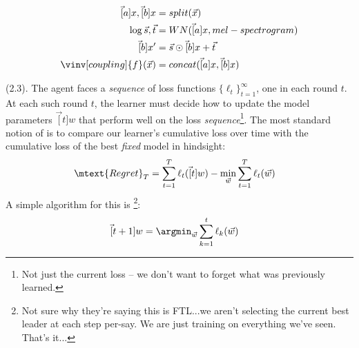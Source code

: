 \documentclass[11pt]{article}
\begin{document}


\begin{align}
\vec[a]{x}, \vec[b]{x}
&= split(\vec x) \\
\log \vec s , \vec t
&= WN(\vec[a]{x}, mel-spectrogram) \\
\vec[b]{x}'
&= \vec s \odot \vec[b]{x} + \vec t \\
\vinv[coupling]{f}(\vec x)
&= concat(\vec[a]{x}, \vec[b]{x})
\end{align}











\label{Meta Learning}








 (2.3). The agent faces a \textit{sequence} of loss functions $\{ \ell_t  \}_{t=1}^{\infty}$, one in each round $t$. At each such round $t$, the learner must decide how to update the model parameters $\vec[t]{w}$ that perform well on the loss \textit{sequence}\footnote{Not just the current loss -- we don't want to forget what was previously learned.}. The most standard notion of  is to compare our learner's cumulative loss over time with the cumulative loss of the best \textit{fixed} model in hindsight:
\begin{align}
	\mtext{Regret}_T
		&= \sum_{t=1}^T \ell_t( \vec[t]{w} ) - \min_{\vec w} \sum_{t=1}^T \ell_t(\vec w) \label{eq:online-regret}
\end{align}
A simple algorithm for this is \footnote{Not sure why they're saying this is FTL...we aren't selecting the current best leader at each step per-say. We are just training on everything we've seen. That's it...}:
\begin{align}
	\vec[t+1]{w}
		&= \argmin_{\vec w} \sum_{k=1}^t \ell_k (\vec w) \label{eq:ftl}
\end{align}
\end{document}
